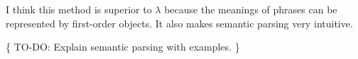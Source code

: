 I think this method is superior to $\lambda$ because the meanings of phrases can be represented by first-order objects.  It also makes semantic parsing very intuitive.

\{ TO-DO:  Explain semantic parsing with examples. \}

%
%
%
%

